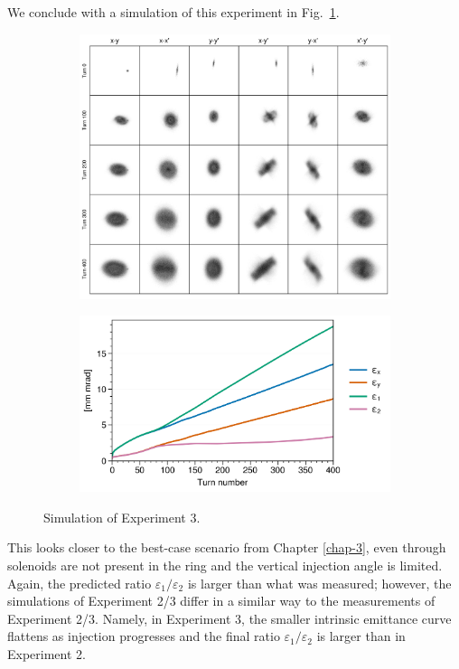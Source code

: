 We conclude with a simulation of this experiment in Fig.~\ref{fig:exp3_sim}.
%
\begin{figure}[!p]
    \centering
    \begin{subfigure}{0.85\textwidth}
        \includegraphics[width=\textwidth]{Images/chapter5/exp3/sim_snapshots.png}
    \end{subfigure}
    \vfill
    \vspace*{1.0cm}
    \vfill
    \begin{subfigure}{0.7\textwidth}
        \includegraphics[width=\textwidth]{Images/chapter5/exp3/sim_emittances.png}
    \end{subfigure}
    \caption{Simulation of Experiment 3.}
    \label{fig:exp3_sim}
\end{figure}
%
This looks closer to the best-case scenario from Chapter \ref{chap-3}, even through solenoids are not present in the ring and the vertical injection angle is limited. Again, the predicted ratio $\varepsilon_1 / \varepsilon_2$ is larger than what was measured; however, the simulations of Experiment 2/3 differ in a similar way to the measurements of Experiment 2/3. Namely, in Experiment 3, the smaller intrinsic emittance curve flattens as injection progresses and the final ratio $\varepsilon_1 / \varepsilon_2$ is larger than in Experiment 2. 

